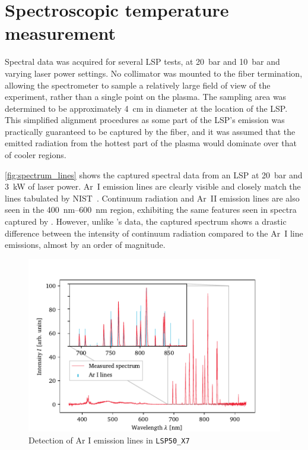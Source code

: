     \clearpage
    \section{Spectroscopic temperature measurement} \label{sec:results_spectroscopy}
        Spectral data was acquired for several LSP tests, at \qty{20}{bar} and \qty{10}{bar} and varying laser power settings. No collimator was mounted to the fiber termination, allowing the spectrometer to sample a relatively large field of view of the experiment, rather than a single point on the plasma. The sampling area was determined to be approximately \qty{4}{cm} in diameter at the location of the LSP. This simplified alignment procedures as some part of the LSP's emission was practically guaranteed to be captured by the fiber, and it was assumed that the emitted radiation from the hottest part of the plasma would dominate over that of cooler regions.

        \autoref{fig:spectrum_lines} shows the captured spectral data from an LSP at \qty{20}{bar} and \qty{3}{kW} of laser power. Ar~I emission lines are clearly visible and closely match the lines tabulated by NIST~\cite{kramidaNISTAtomicSpectra2022}. Continuum radiation and Ar~II emission lines are also seen in the \qtyrange{400}{600}{nm} region, exhibiting the same features seen in spectra captured by \textcite{luCharacteristicDiagnosticsLaserStabilized2022}. However, unlike \citeauthor{luCharacteristicDiagnosticsLaserStabilized2022}'s data, the captured spectrum shows a drastic difference between the intensity of continuum radiation compared to the Ar~I line emissions, almost by an order of magnitude.

        \begin{figure}[h]
            \centering
            \includegraphics[]{assets/5 results/spectrum_LSP50_X7_lines}
            \caption{Detection of Ar I emission lines in \texttt{LSP50\_X7}}
            \label{fig:spectrum_lines}
        \end{figure}

